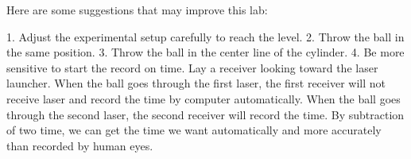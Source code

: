 Here are some suggestions that may improve this lab:
\begin{enumerate}
1. Adjust the experimental setup carefully to reach the level. 2. Throw the ball in the same position.
3. Throw the ball in the center line of the cylinder.
4. Be more sensitive to start the record on time. 
Lay a receiver looking toward the laser launcher. When the ball goes through the
first laser, the first receiver will not receive laser and record the time by
computer automatically. When the ball goes through the second laser, the second
receiver will record the time. By subtraction of two time, we can get the time
we want automatically and more accurately than recorded by human eyes. 
\end{enumerate}